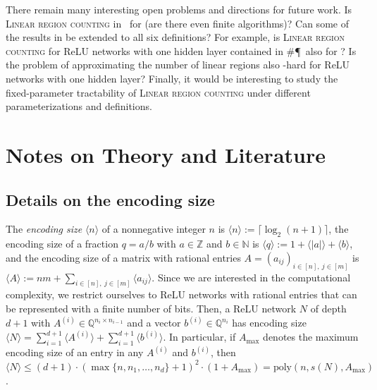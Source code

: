 \documentclass{article}
\begin{document}
There remain many interesting open problems and directions for future work.
Is \textsc{Linear region counting} in \EXP\TIME\ for  (are there even finite algorithms)?
Can some of the results in  be extended to all six definitions?
For example, is \textsc{Linear region counting} for ReLU networks with one hidden layer contained in \#\P\ also for ?
Is the problem of approximating the number of linear regions also \NP-hard for ReLU networks with one hidden layer?
Finally, it would be interesting to study the fixed-parameter tractability of \textsc{Linear region counting} under different parameterizations and definitions.





\appendix

\section{Notes on Theory and Literature}

\subsection{Details on the encoding size}
\label{sec:encoding}
The \emph{encoding size} $\langle n\rangle$ of a nonnegative integer $n$ is $\langle n\rangle:=\lceil\log_2(n+1)\rceil$, the encoding size of a fraction $q=a/b$ with $a\in \mathbb{Z}$ and $b\in \mathbb{N}$ is $\langle q\rangle := 1 + \langle |a|\rangle + \langle b\rangle$, and the encoding size of a matrix with rational entries $A=(a_{ij})_{i\in [n],\ j\in [m]}$ is $\langle A\rangle := nm + \sum_{i\in [n],\ j\in [m]}\langle a_{ij}\rangle$.
Since we are interested in the computational complexity, we restrict ourselves to ReLU networks with rational entries that can be represented with a finite number of bits.
Then, a ReLU network $N$ of depth $d+1$ with $A^{(i)}\in \mathbb{Q}^{n_i\times n_{i-1}}$ and a vector $b^{(i)}\in \mathbb{Q}^{n_i}$ has encoding size
$
\langle N\rangle = \sum_{i=1}^{d+1} \langle A^{(i)}\rangle + \sum_{i=1}^{d+1}\langle b^{(i)}\rangle
$.
In particular, if $A_{\max}$ denotes the maximum encoding size of an entry in any $A^{(i)}$ and $b^{(i)}$, then $\langle N\rangle \leq (d+1)\cdot (\max\{n,n_1,\dots,n_d\}+1)^2 \cdot (1+A_{\max})=\text{poly}(n,s(N),A_{\max})$.
\end{document}
